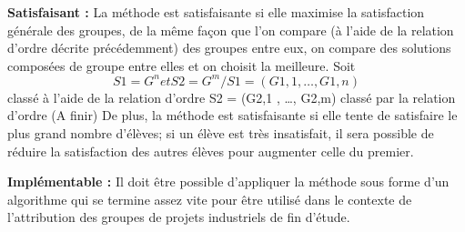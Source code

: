 \documentclass{article}
\begin{document}
\textbf{Satisfaisant :} La méthode est satisfaisante si elle maximise la satisfaction générale des groupes, de la même façon que l’on compare (à l’aide de la relation d’ordre décrite précédemment) des groupes entre eux, on compare des solutions composées de groupe entre elles et on choisit la meilleure.
Soit \[S1 = G^n et S2= G^m/ S1 = (G1,1 , …, G1,n)\] classé à l’aide de la relation d’ordre
				S2 = (G2,1 , …, G2,m) classé par la relation d’ordre
(A finir)
De plus, la méthode est satisfaisante si elle tente de satisfaire le plus grand nombre d’élèves; si un élève est très insatisfait, il sera possible de réduire la satisfaction des autres élèves pour augmenter celle du premier. \par


\textbf{Implémentable :} Il doit être possible d'appliquer la méthode sous forme d'un algorithme qui se termine assez vite pour être utilisé dans le contexte de l’attribution des groupes de projets industriels de fin d’étude. \par
\end{document}
